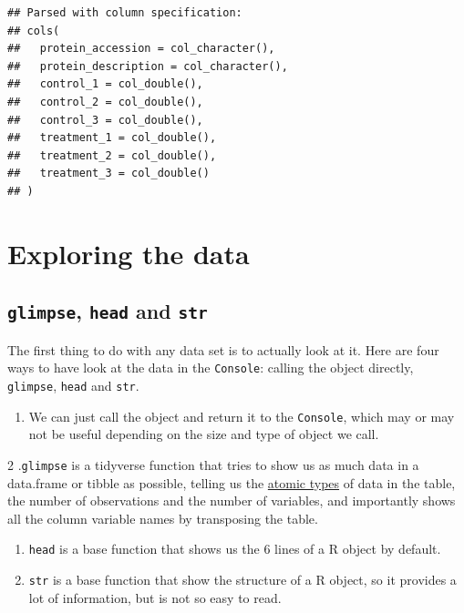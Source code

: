 \documentclass[12pt,]{book}
\providecommand{\tightlist}{%
  \setlength{\itemsep}{0pt}\setlength{\parskip}{0pt}}
\begin{document}
\begin{verbatim}
## Parsed with column specification:
## cols(
##   protein_accession = col_character(),
##   protein_description = col_character(),
##   control_1 = col_double(),
##   control_2 = col_double(),
##   control_3 = col_double(),
##   treatment_1 = col_double(),
##   treatment_2 = col_double(),
##   treatment_3 = col_double()
## )
\end{verbatim}

\hypertarget{exploring-the-data}{%
\section{Exploring the data}\label{exploring-the-data}}

\hypertarget{glimpse-head-and-str}{%
\subsection{\texorpdfstring{\texttt{glimpse}, \texttt{head} and \texttt{str}}{glimpse, head and str}}\label{glimpse-head-and-str}}

The first thing to do with any data set is to actually look at it. Here are
four ways to have look at the data in the \texttt{Console}: calling the object directly,
\texttt{glimpse}, \texttt{head} and \texttt{str}.

\begin{enumerate}
\def\labelenumi{\arabic{enumi}.}
\tightlist
\item
  We can just call the object and return it to the \texttt{Console}, which may or may
  not be useful depending on the size and type of object we call.
\end{enumerate}

2 .\texttt{glimpse} is a tidyverse function that tries to show us as much data in
a data.frame or tibble as possible, telling us the \protect\hyperlink{atomics}{atomic types} of
data in the table, the number of observations and the number of variables, and
importantly shows all the column variable names by transposing the table.

\begin{enumerate}
\def\labelenumi{\arabic{enumi}.}
\setcounter{enumi}{2}
\item
  \texttt{head} is a base function that shows us the 6 lines of a R object by default.
\item
  \texttt{str} is a base function that show the structure of a R object, so it provides
  a lot of information, but is not so easy to read.
\end{enumerate}
\end{document}
